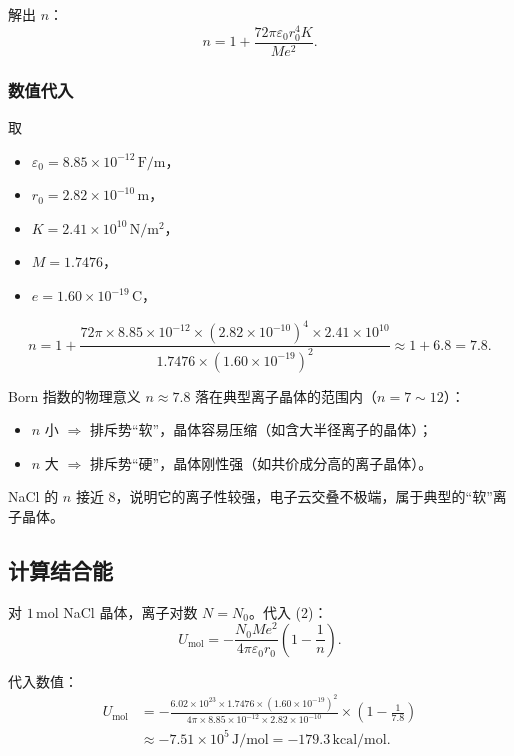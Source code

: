 解出 $n$：
\[
  \boxed{ n = 1 + \frac{72\pi\varepsilon_0 r_0^4 K}{Me^2} }. \tag{3}
\]

\subsubsection{数值代入}

取
\begin{itemize}[nosep]
  \item $\varepsilon_0 = 8.85\times 10^{-12}\,\mathrm{F/m}$，
  \item $r_0 = 2.82\times 10^{-10}\,\mathrm{m}$，
  \item $K = 2.41\times 10^{10}\,\mathrm{N/m^2}$，
  \item $M = 1.7476$，
  \item $e = 1.60\times 10^{-19}\,\mathrm{C}$，
\end{itemize}

\[
  n = 1 + \frac{72\pi\times 8.85\times 10^{-12}\times (2.82\times 10^{-10})^4
          \times 2.41\times 10^{10}}
         {1.7476\times (1.60\times 10^{-19})^2}
    \approx 1 + 6.8
    = \boxed{7.8}.
\]

\begin{insightbox}{Born 指数的物理意义}
$n \approx 7.8$ 落在典型离子晶体的范围内（$n = 7\sim 12$）：
\begin{itemize}[nosep]
  \item $n$ 小 $\Rightarrow$ 排斥势``软''，晶体容易压缩（如含大半径离子的晶体）；
  \item $n$ 大 $\Rightarrow$ 排斥势``硬''，晶体刚性强（如共价成分高的离子晶体）。
\end{itemize}
NaCl 的 $n$ 接近 $8$，说明它的离子性较强，电子云交叠不极端，属于典型的``软''离子晶体。
\end{insightbox}

\subsection{计算结合能}

对 $1\,\mathrm{mol}$ NaCl 晶体，离子对数 $N = N_0$。代入 (2)：
\[
  U_{\text{mol}} = -\frac{N_0 Me^2}{4\pi\varepsilon_0 r_0}
                  \left(1 - \frac{1}{n}\right).
\]

代入数值：
\begin{align*}
  U_{\text{mol}}
  &= -\frac{6.02\times 10^{23}\times 1.7476\times (1.60\times 10^{-19})^2}
          {4\pi\times 8.85\times 10^{-12}\times 2.82\times 10^{-10}}
    \times\left(1 - \frac{1}{7.8}\right) \\
  &\approx \boxed{ -7.51\times 10^{5}\,\mathrm{J/mol} }
   = \boxed{ -179.3\,\mathrm{kcal/mol} }.
\end{align*}

